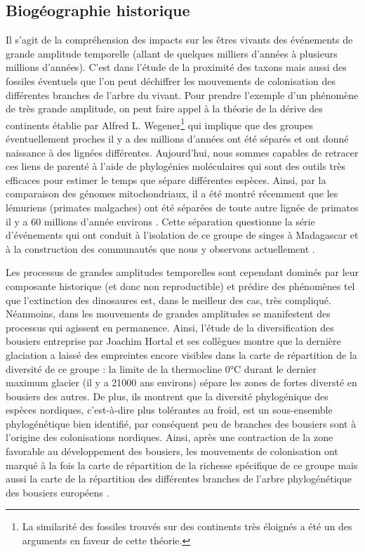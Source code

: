 \subsection*{Biogéographie
historique}\label{bioguxe9ographie-historique}

Il s'agit de la compréhension des impacts sur les êtres vivants des
événements de grande amplitude temporelle (allant de quelques milliers
d'années à plusieurs millions d'années). C'est dans l'étude de la
proximité des taxons mais aussi des fossiles éventuels que l'on peut
déchiffrer les mouvements de colonisation des différentes branches de
l'arbre du vivant. Pour prendre l'exemple d'un phénomène de très grande
amplitude, on peut faire appel à la théorie de la dérive des continents
établie par Alfred L. Wegener\footnote{La similarité des fossiles
  trouvés sur des continents très éloignés a été un des arguments en
  faveur de cette théorie.} qui implique que des groupes éventuellement
proches il y a des millions d'années ont été séparés et ont donné
naissance à des lignées différentes. Aujourd'hui, nous sommes capables
de retracer ces liens de parenté à l'aide de phylogénies moléculaires
qui sont des outils très efficaces pour estimer le temps que sépare
différentes espèces. Ainsi, par la comparaison des génomes
mitochondriaux, il a été montré récemment que les lémuriens (primates
malgaches) ont été séparées de toute autre lignée de primates il y a 60
millions d'année environs \citep{Finstermeier2013}. Cette séparation
questionne la série d'événements qui ont conduit à l'isolation de ce
groupe de singes à Madagascar et à la construction des communautés que
nous y observons actuellement \citep{Razafindratsima2013}.

Les processus de grandes amplitudes temporelles sont cependant dominés
par leur composante historique (et donc non reproductible) et prédire
des phénomènes tel que l'extinction des dinosaures est, dans le meilleur
des cas, très compliqué. Néanmoins, dans les mouvements de grandes
amplitudes se manifestent des processus qui agissent en permanence.
Ainsi, l'étude de la diversification des bousiers entreprise par Joachim
Hortal et ses collègues \citep{Hortal2011} montre que la dernière
glaciation a laissé des empreintes encore visibles dans la carte de
répartition de la diversité de ce groupe : la limite de la thermocline
0°C durant le dernier maximum glacier (il y a 21000 ans environs) sépare
les zones de fortes diversté en bousiers des autres. De plus, ils
montrent que la diversité phylogénique des espèces nordiques,
c'est-à-dire plus tolérantes au froid, est un sous-ensemble
phylogénétique bien identifié, par conséquent peu de branches des
bousiers sont à l'origine des colonisations nordiques. Ainsi, après une
contraction de la zone favorable au développement des bousiers, les
mouvements de colonisation ont marqué à la fois la carte de répartition
de la richesse spécifique de ce groupe mais aussi la carte de la
répartition des différentes branches de l'arbre phylogénétique des
bousiers européens \citep{Hortal2011}.

